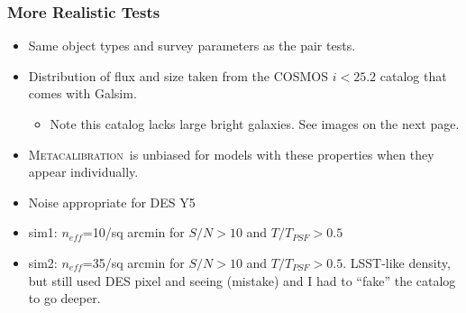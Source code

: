 \documentclass{beamer}
\newcommand{\Mcal}{\textsc{Metacalibration}}
\newcommand{\neff}{$n_{eff}$}
\begin{document}
\frame
{
    \frametitle{More Realistic Tests}

 
    \begin{itemize}

        \item Same object types and survey parameters as the pair tests.

        \item Distribution of flux and size taken from the COSMOS $i<25.2$ catalog
            that comes with Galsim.
            \begin{itemize}
                \item Note this catalog lacks large bright galaxies. See images
                    on the next page.
            \end{itemize}

        \item \Mcal\ is unbiased for models with these properties when they
            appear individually.

        \item Noise appropriate for DES Y5

        \item sim1: \neff=10/sq arcmin for $S/N > 10$ and $T/T_{PSF} > 0.5$
            
        \item sim2: \neff=35/sq arcmin for $S/N > 10$ and $T/T_{PSF} > 0.5$.
            LSST-like density, but still used DES pixel and seeing (mistake)
            and I had to ``fake'' the catalog to go deeper.


    \end{itemize}

}
\end{document}
